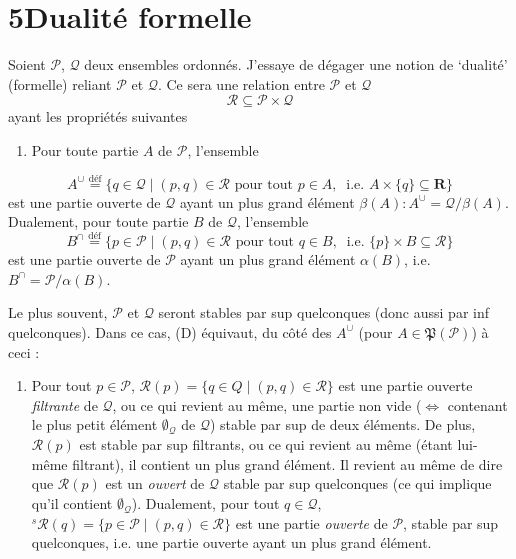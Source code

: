 \section*{5\quad Dualité formelle}

Soient $\mathcal{P}$, $\mathcal{Q}$ deux ensembles ordonnés. J'essaye de dégager une notion de `dualité' (formelle) reliant $\mathcal{P}$ et $\mathcal{Q}$. Ce sera une relation entre $\mathcal{P}$ et $\mathcal{Q}$
\[
\mathcal{R} \subseteq \mathcal{P} \times \mathcal{Q}
\tag*{(5.1)}
\]
ayant les propriétés suivantes
\begin{enumerate}[leftmargin=*, labelindent=0.5em]
\item[(D)] Pour toute partie $A$ de $\mathcal{P}$, l'ensemble
\end{enumerate}
\[
A^\cup \overset{\text{déf}}{=} \{ q \in \mathcal{Q} \mid (p,q) \in \mathcal{R} \text{ pour tout } p \in A,\ \text{ i.e. } A \times \{q\} \subseteq \mathbf{R} \} %
\]
est une partie ouverte de $\mathcal{Q}$ ayant un plus grand élément $\beta(A) : A^\cup = \mathcal{Q}/\beta(A)$. Dualement, pour toute partie $B$ de $\mathcal{Q}$, l'ensemble
\[
B^\cap \overset{\text{déf}}{=} \{ p \in \mathcal{P} \mid (p,q) \in \mathcal{R} \text{ pour tout } q \in B,\ \text{ i.e. } \{p\} \times B \subseteq \mathcal{R} \}
\]
est une partie ouverte de $\mathcal{P}$ ayant un plus grand élément $\alpha(B)$, i.e. $B^\cap = \mathcal{P}/\alpha(B)$.

Le plus souvent, $\mathcal{P}$ et $\mathcal{Q}$ seront stables par sup quelconques (donc aussi par inf quelconques). Dans ce cas, (D) équivaut, du côté des $A^\cup$ (pour $A \in \mathfrak{P}(\mathcal{P})$) à ceci :
\begin{enumerate}[leftmargin=*, labelindent=0em]
\item[(D$_0$)] Pour tout $p \in \mathcal{P}$, $\mathcal{R}(p) = \{ q \in Q \mid (p,q) \in \mathcal{R} \}$ est une partie ouverte \textit{filtrante} de $\mathcal{Q}$, ou ce qui revient au même, une partie non vide ($\Longleftrightarrow$ contenant le plus petit élément $\emptyset_{\mathcal{Q}}$ de $\mathcal{Q}$) stable par sup de deux éléments. De plus, $\mathcal{R}(p)$ est stable par sup filtrants, ou ce qui revient au même (étant lui-même filtrant), il contient un plus grand élément. Il revient %
au même de dire que $\mathcal{R}(p)$ est un \textit{ouvert} de $\mathcal{Q}$ stable par sup quelconques (ce qui implique qu'il contient $\emptyset_{\mathcal{Q}}$). Dualement, pour tout $q \in \mathcal{Q}$, ${}^{s}\mathcal{R}(q) = \{ p \in \mathcal{P} \mid (p,q) \in \mathcal{R} \}$ est une partie \textit{ouverte} de $\mathcal{P}$, stable par sup quelconques, i.e. une partie ouverte ayant un plus grand élément. %
\end{enumerate}

